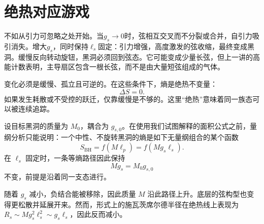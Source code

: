 \section{绝热对应游戏}

不如从引力可忽略之处开始。当\(g_s\to0\)时，弦相互交叉而不分裂或合并，自引力吸引消失。增大\(g_s\)，同时保持\(\ell_s\)固定：引力增强，高度激发的弦收缩，最终变成黑洞。缓慢反向转动旋钮，黑洞必须回到弦态。它可能变成少量长弦，但上一讲的高能计数表明，主导扇区包含一根长弦，而不是由大量短弦组成的气体。

\begin{classroomqa}
\end{classroomqa}

变化必须是缓慢、孤立且可逆的。在这些条件下，熵是绝热不变量：
\begin{equation}
\Delta S=0.
\label{eq:l07-adiabatic}
\end{equation}
如果发生耗散或不受控的跃迁，仅靠缓慢是不够的。这里``绝热''意味着同一族态可以被连续追踪。

设目标黑洞的质量为 \(M_0\)，耦合为 \(g_{s,0}\)。在使用我们试图解释的面积公式之前，量纲分析只能说明：一个中性、不旋转黑洞的熵是如下无量纲组合的某个函数
\begin{equation}
S_{\mathrm{BH}}=f(M\ell_p)
=f(Mg_s\ell_s).
\label{eq:l07-entropy-function}
\end{equation}
在 \(\ell_s\) 固定时，一条等熵路径因此保持
\begin{equation}
Mg_s=M_0g_{s,0}
\label{eq:l07-adiabat}
\end{equation}
不变，前提是沿着同一支态进行。

随着 \(g_s\) 减小，负结合能被移除，因此质量 \(M\) 沿此路径上升。底层的弦构型也变得更松散并延展开来。然而，形式上的施瓦茨席尔德半径在绝热线上表现为 \(R_s\sim Mg_s^2\ell_s^2\sim g_s\ell_s\)，因此反而减小。

\begin{classroomqa}
\end{classroomqa}

